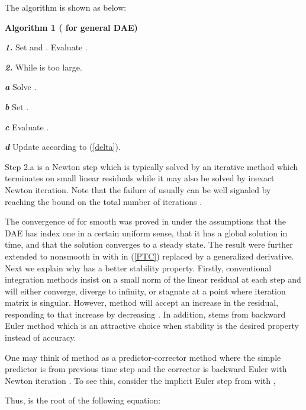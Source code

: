 \documentclass[journal]{IEEEtran}
\begin{document}
The algorithm is shown as below:
\begin{IEEEdescription}
\item[\textbf{Algorithm 1 ( for general DAE)}]
\item[\textbf{\textit{1.}}] Set  and . Evaluate .
\item[\textbf{\textit{2.}}] While  is too large.
\begin{LaTeXdescription}
\item[\textbf{\textit{a}}] Solve .
\item[\textbf{\textit{b}}] Set .
\item[\textbf{\textit{c}}] Evaluate .
\item[\textbf{\textit{d}}] Update  according to (\ref{delta}).
\end{LaTeXdescription}
\end{IEEEdescription}

Step 2.a is a Newton step which is typically solved by an iterative method which terminates on small linear residuals while it may also be solved by inexact Newton iteration. Note that the failure of  usually can be well signaled by reaching the bound on the total number of iterations \cite{Kelley:article}.

The convergence of  for smooth  was proved in \cite{Kelley:article2} under the assumptions that the DAE has index one in a certain uniform sense, that it has a global solution in time, and that the solution converges to a steady state. The result were further extended to nonsmooth  in \cite{Kelley:article3} with  in (\ref{PTC}) replaced by a generalized derivative. 
Next we explain why  has a better stability property. Firstly, conventional integration methods insist on a small norm of the linear residual at each step and will either converge, diverge to infinity, or stagnate at a point where iteration matrix is singular. However,  method will accept an increase in the residual, responding to that increase by decreasing \cite{Kelley:article2}. In addition,  stems from backward Euler method which is an attractive choice when stability is the desired property instead of accuracy.



One may think of  method as a predictor-corrector method where the simple predictor is from previous time step and the corrector is backward Euler with Newton iteration \cite{Kelley:article}. To see this, consider the implicit Euler step from  with ,

Thus,  is the root of the following equation:
\end{document}
